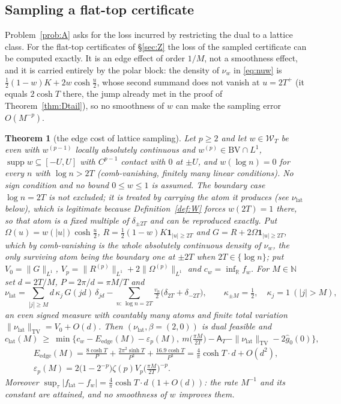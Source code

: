 \documentclass[11pt]{amsart}
\newtheorem{theorem}{Theorem}[section]
\theoremstyle{definition}
\theoremstyle{remark}
\newcommand{\R}{\mathbb R}
\newcommand{\N}{\mathbb N}
\newcommand{\supp}{\operatorname{supp}}
\newcommand{\TV}{\operatorname{TV}}
\newcommand{\gh}[1]{\widehat g_{#1}}
\newcommand{\Wcl}{\mathcal W_T}
\newcommand{\Aconst}{\mathsf A_T}
\begin{document}
\subsection{Sampling a flat-top certificate}\label{subsec:lat}
Problem~\ref{prob:A} asks for the loss incurred by restricting the dual to a lattice class. For the
flat-top certificates of \S\ref{sec:Z} the loss of the sampled certificate can be computed
exactly. It is an edge effect of order $1/M$, not a smoothness effect, and it is carried entirely by
the polar block: the density of $\nu_w$ in \eqref{eq:nuw} is $\frac12(1-w)K+2w\cosh\frac u2$, whose
second summand does not vanish at $u=2T^+$ (it equals $2\cosh T$ there, the jump already met in
the proof of Theorem~\ref{thm:Dtail}), so no smoothness of $w$ can make the sampling error
$O(M^{-p})$.

\begin{theorem}[the edge cost of lattice sampling]\label{thm:latedge}
Let $p\ge2$ and let $w\in\Wcl$ be even with $w^{(p-1)}$ locally absolutely continuous and
$w^{(p)}\in \mathrm{BV}\cap L^1$, $\supp w\subseteq[-U,U]$ with $C^{p-1}$ contact with $0$ at $\pm U$,
and $w(\log n)=0$ for every $n$ with $\log n>2T$ \textup{(}comb-vanishing, finitely many linear
conditions\textup{)}. No sign condition and no bound $0\le w\le1$ is assumed. The boundary case
$\log n=2T$ is not excluded; it is treated by carrying the atom it produces \textup{(}see
$\nu_{\mathrm{lat}}$ below\textup{)}, which is legitimate because Definition~\ref{def:W} forces
$w(2T)=1$ there, so that atom is a fixed multiple of $\delta_{\pm2T}$ and can be reproduced exactly.
Put
$\Omega(u)=w(|u|)\cosh\frac u2$, $R=\frac12(1-w)K\mathbf 1_{|u|\ge2T}$ and
$G=R+2\Omega\mathbf 1_{|u|\ge2T}$, which by comb-vanishing is the whole absolutely continuous density
of $\nu_w$, the only surviving atom being the boundary one at $\pm2T$ when $2T\in\{\log n\}$; put
$V_0=\|G\|_{L^1}$, $V_p=\|R^{(p)}\|_{L^1}+2\|\Omega^{(p)}\|_{L^1}$ and $c_w=\inf_\R f_w$. For $M\in\N$ set
$d=2T/M$, $P=2\pi/d=\pi M/T$ and
\[
\nu_{\mathrm{lat}}=\sum_{|j|\ge M}d\,\kappa_j\,G(jd)\,\delta_{jd}
-\sum_{n:\,\log n=2T}\tfrac{v_n}2\big(\delta_{2T}+\delta_{-2T}\big),\qquad
\kappa_{\pm M}=\tfrac12,\quad\kappa_j=1\ (|j|>M),
\]
an even signed measure with countably many atoms and finite total variation
$\|\nu_{\mathrm{lat}}\|_{\TV}=V_0+O(d)$. Then $(\nu_{\mathrm{lat}},\beta=(2,0))$ is dual feasible and
\[
c_{\mathrm{lat}}(M)\ \ge\ \min\Big\{c_w-E_{\mathrm{edge}}(M)-\varepsilon_p(M),\
m\big(\tfrac{\pi M}{2T}\big)-\Aconst-\|\nu_{\mathrm{lat}}\|_{\TV}-2\gh0(0)\Big\},
\]
\begin{gather*}
E_{\mathrm{edge}}(M)=\frac{8\cosh T}{P}+\frac{2\pi^2\sinh T}{P^2}+\frac{16.9\cosh T}{P^3}
=\frac4\pi\cosh T\cdot d+O(d^2),\\
\varepsilon_p(M)=2\big(1-2^{-p}\big)\zeta(p)V_p\Big(\frac{\pi M}{2T}\Big)^{-p}.
\end{gather*}
Moreover $\sup_\tau|f_{\mathrm{lat}}-f_w|=\frac4\pi\cosh T\cdot d\,(1+O(d))$: the rate $M^{-1}$ and
its constant are attained, and no smoothness of $w$ improves them.
\end{theorem}
\end{document}
